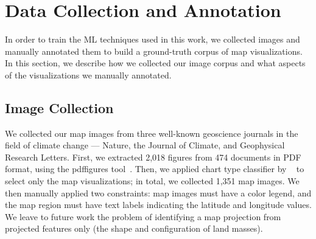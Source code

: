 \section{Data Collection and Annotation}
\label{sec:corpus}
In order to train the \ac{ML} techniques used in this work, we collected images and manually annotated them to build a ground-truth corpus of map visualizations.
In this section, we describe how we collected our image corpus and what aspects of the visualizations we manually annotated.

\figDataset


\subsection{Image Collection}
\label{subsec:imageCollection}
We collected our map images from three well-known geoscience journals in the field of climate change --- Nature, the Journal of Climate, and Geophysical Research Letters. First, we extracted 2,018 figures from 474 documents in PDF format, using the pdffigures tool~\citep{pdffigures2-2016}. Then, we applied chart type classifier by \citeauthor{Poco2017}~\citep{Poco2017} to select only the map visualizations; in total, we collected 1,351 map images.
We then manually applied two constraints: map images must have a color legend, and the map region must have text labels indicating the latitude and longitude values. We leave to future work the problem of identifying a map projection from projected features only (\eg the shape and configuration of land masses).

